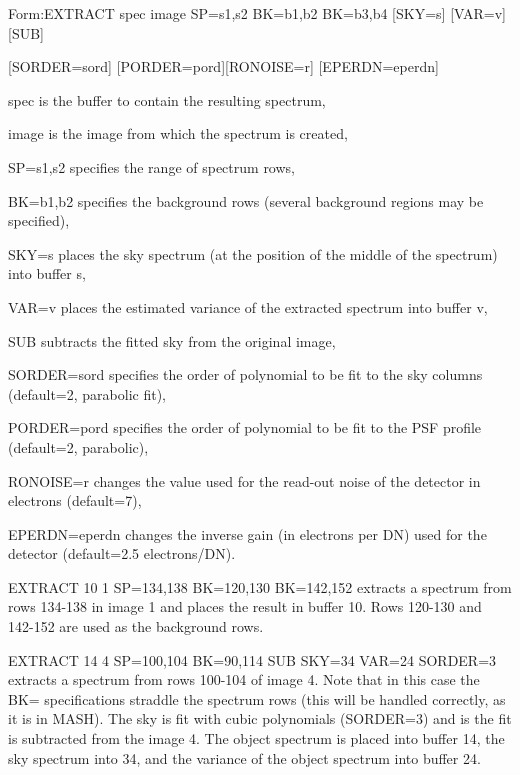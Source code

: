 {\newpage\clearpage
{}%
\begin{command}
  \item[Form:EXTRACT spec image SP=s1,s2 BK=b1,b2 BK=b3,b4 {[SKY=s]} 
       {[VAR=v]} {[SUB]}\hfill]{}
  \item[{[SORDER=sord]} {[PORDER=pord]}{[RONOISE=r]} 
        {[EPERDN=eperdn]} \hfill]{}
  \item[spec\hfill]{is the buffer to contain the resulting spectrum,}
  \item[image\hfill]{is the image from which the spectrum is created,}
  \item[SP=s1,s2\hfill]{specifies the range of spectrum rows,}
  \item[BK=b1,b2\hfill]{specifies the background rows (several background
       regions may be specified),}
  \item[SKY=s\hfill]{places the sky spectrum (at the position of the
       middle of the spectrum) into buffer s,}
  \item[VAR=v\hfill]{places the estimated variance of the extracted
       spectrum into buffer v,}
  \item[SUB\hfill]{subtracts the fitted sky from the original image,}
  \item[SORDER=sord\hfill]{specifies the order of polynomial to be fit to the
       sky columns (default=2, parabolic fit),}
  \item[PORDER=pord\hfill]{specifies the order of polynomial to be fit to the
       PSF profile (default=2, parabolic),}
  \item[RONOISE=r\hfill]{changes the value used for the read-out noise of the
       detector in electrons (default=7),}
  \item[EPERDN=eperdn\hfill]{changes the inverse gain (in electrons per DN) 
       used for the detector (default=2.5 electrons/DN).}
\end{command}%
\lthtmlfigureZ
\lthtmlcheckvsize\clearpage}

{\newpage\clearpage
{}%
\begin{example}
  \item[EXTRACT 10 1 SP=134,138 BK=120,130 BK=142,152\hfill]{ extracts a
       spectrum from rows 134-138 in image 1 and places the result in
       buffer 10.  Rows 120-130 and 142-152 are used as the background
       rows.}
\par\item[EXTRACT 14 4 SP=100,104 BK=90,114 SUB SKY=34 VAR=24
       SORDER=3\hfill]{ extracts a spectrum from rows 100-104 of image 4.
       Note that in this case the BK= specifications straddle the spectrum
       rows (this will be handled correctly, as it is in MASH).  The sky is
       fit with cubic polynomials (SORDER=3) and is the fit is subtracted
       from the image 4.  The object spectrum is placed into buffer 14, the
       sky spectrum into 34, and the variance of the object spectrum into
       buffer 24.}
\end{example}%
\lthtmlfigureZ
\lthtmlcheckvsize\clearpage}

